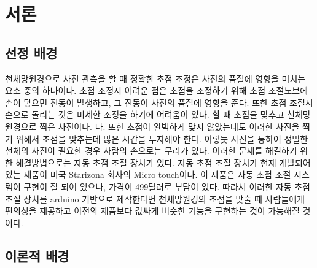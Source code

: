 \documentclass{abstract_hutech}
\begin{document}
\thispagestyle{firstpage}

\section{서론}

\subsection{선정 배경}

천체망원경으로 사진 관측을 할 때 정확한 초점 조정은 사진의 품질에 영향을 미치는 요소 중의 하나이다. 초점 조정시 어려운 점은 초점을 조정하기 위해  초점 조절노브에 손이 닿으면 진동이 발생하고, 그 진동이 사진의 품질에 영향을 준다. 또한 초점 조절시 손으로 돌리는 것은 미세한 조정을 하기에 어려움이 있다. 할 때 초점을 맞추고 천체망원경으로 찍은 사진이다. 다. 또한 초점이 완벽하게 맞지 않았는데도 이러한 사진을 찍기 위해서 초점을 맞추는데 많은 시간을 투자해야 한다. 이렇듯 사진을 통하여 정밀한 천체의 사진이 필요한 경우 사람의 손으로는 무리가 있다. 이러한 문제를 해결하기 위한 해결방법으로는 자동 초점 조절 장치가 있다. 자동 초점 조절 장치가 현재 개발되어 있는 제품이 미국 Starizona 회사의 Micro touch이다. 이 제품은 자동 초점 조절 시스템이 구현이 잘 되어 있으나, 가격이 499달러로 부담이 있다. 따라서 이러한 자동 초점 조절 장치를 arduino 기반으로 제작한다면 천체망원경의 초점을 맞출 때 사람들에게 편의성을 제공하고 이전의 제품보다 값싸게 비슷한 기능을 구현하는 것이 가능해질 것이다.

\subsection{이론적 배경}
\end{document}
